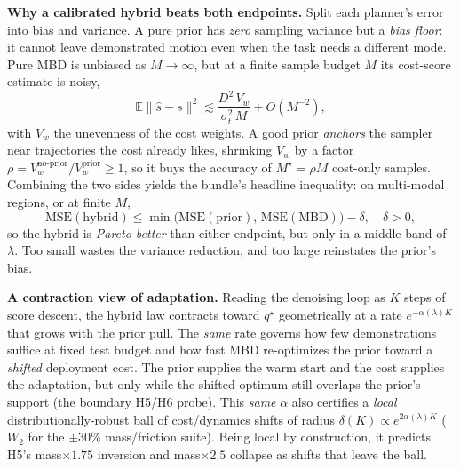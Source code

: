 \documentclass[letterpaper, 10 pt, conference]{ieeeconf}
\begin{document}
\textbf{Why a calibrated hybrid beats both endpoints.} Split each
planner's error into bias and variance. A pure prior has \emph{zero}
sampling variance but a \emph{bias floor}: it cannot leave demonstrated
motion even when the task needs a different mode. Pure MBD is unbiased as
$M\!\to\!\infty$, but at a finite sample budget $M$ its cost-score
estimate is noisy,
\begin{equation}
\mathbb{E}\big\|\hat s-s\big\|^2 \lesssim
\frac{D^2\,V_w}{\sigma_t^2\,M}+O(M^{-2}),
\label{eq:snis}
\end{equation}
with $V_w$ the unevenness of the cost weights. A good prior \emph{anchors}
the sampler near trajectories the cost already likes, shrinking $V_w$ by a
factor $\rho=V_w^{\text{no-prior}}/V_w^{\text{prior}}\!\ge\!1$, so it buys
the accuracy of $M^\star\!=\!\rho M$ cost-only samples. Combining
the two sides yields the bundle's headline inequality: on multi-modal
regions, or at finite $M$,
\begin{equation}
\mathrm{MSE}(\text{hybrid})\le
\min\!\big(\mathrm{MSE}(\text{prior}),\,\mathrm{MSE}(\text{MBD})\big)-\delta,
\quad \delta>0,
\label{eq:pareto}
\end{equation}
so the hybrid is \emph{Pareto-better} than either endpoint, but only in a
middle band of $\lambda$. Too small wastes the variance reduction, and too
large reinstates the prior's bias.

\textbf{A contraction view of adaptation.} Reading the denoising loop as
$K$ steps of score descent, the hybrid law contracts toward $q^\star$
geometrically at a rate $e^{-\alpha(\lambda)K}$ that grows with the prior
pull. The \emph{same} rate governs how few demonstrations suffice at fixed
test budget and how fast MBD re-optimizes the prior toward a \emph{shifted}
deployment cost. The prior supplies the warm start and the cost supplies
the adaptation, but only while the shifted optimum still overlaps the
prior's support (the boundary H5/H6 probe). This \emph{same} $\alpha$ also
certifies a \emph{local} distributionally-robust ball of cost/dynamics
shifts of radius $\delta(K)\!\propto\!e^{2\alpha(\lambda)K}$ ($W_2$ for the
$\pm30\%$ mass/friction suite). Being local by construction, it predicts
H5's mass$\times1.75$ inversion and mass$\times2.5$ collapse as shifts that
leave the ball.
\end{document}
